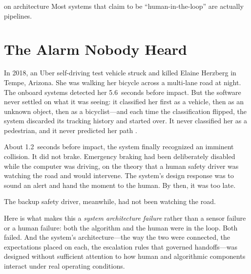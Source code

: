 
\label{chap:ch08}
\begin{chapterquote}{on architecture}
Most systems that claim to be ``human-in-the-loop'' are actually pipelines.
\end{chapterquote}

\section{The Alarm Nobody Heard}
\label{sec:ch08-uber-tempe}

In 2018, an Uber self-driving test vehicle struck and killed Elaine Herzberg in Tempe, Arizona. She was walking her bicycle across a multi-lane road at night. The onboard systems detected her 5.6~seconds before impact. But the software never settled on what it was seeing: it classified her first as a vehicle, then as an unknown object, then as a bicyclist---and each time the classification flipped, the system discarded its tracking history and started over. It never classified her as a pedestrian, and it never predicted her path \autocite{ntsb2019uber}.

About 1.2~seconds before impact, the system finally recognized an imminent collision. It did not brake. Emergency braking had been deliberately disabled while the computer was driving, on the theory that a human safety driver was watching the road and would intervene. The system's design response was to sound an alert and hand the moment to the human. By then, it was too late.

The backup safety driver, meanwhile, had not been watching the road.

Here is what makes this a \emph{system architecture failure} rather than a sensor failure or a human failure: both the algorithm and the human were in the loop. Both failed. And the system's architecture---the way the two were connected, the expectations placed on each, the escalation rules that governed handoffs---was designed without sufficient attention to how human and algorithmic components interact under real operating conditions.


